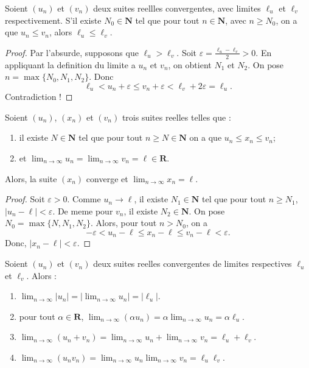 \begin{proposition}
Soient $(u_{n})$ et $(v_{n})$ deux suites reellles convergentes, avec limites $\ell _{u}$ et $\ell _{v}$ respectivement. S'il existe $N_{0}\in \mathbf{N}$ tel que pour tout $n\in \mathbf{N}$, avec $n\ge N_{0}$, on a que $u_{n}\le v_{n}$, alors $\ell _{u}\le \ell _{v}$.
\end{proposition}
\begin{proof}
	Par l'absurde, supposons que $\ell _{u} >\ell _{v}$. Soit $\varepsilon=\frac{\ell _{u}-\ell _{v} }{2}>0$. En appliquant la definition du limite a $u_{n}$ et $v_{n}$, on obtient $N_{1}$ et $N_{2}$. On pose $n=\max\{ N_{0},N_{1},N_{2} \}$. Donc 
	$$
\ell _{u}<u_{n}+\varepsilon\le v_{n}+\varepsilon<\ell _{v}+2\varepsilon=\ell _{u}.
$$
Contradiction !
\end{proof}
\begin{theorem}
Soient $(u_{n})$, $(x_{n})$ et $(v_{n})$ trois suites reelles telles que :
\begin{enumerate}
\item il existe $N\in \mathbf{N}$ tel que pour tout $n\ge N\in \mathbf{N}$ on a que $u_{n}\le x_{n}\le v_n$;
\item et $\lim_{ n \to \infty }u_{n}=\lim_{ n \to \infty }v_{n}=\ell \in \mathbf{R}$.
\end{enumerate}
Alors, la suite $(x_{n})$ converge et $\lim_{ n \to \infty }x_{n}=\ell$.
\end{theorem}
\begin{proof}
Soit $\varepsilon>0$. Comme $u_{n}\to \ell$, il existe $N_{1}\in \mathbf{N}$ tel que pour tout $n\ge N_{1}$, $|u_{n}-\ell|<\varepsilon$. De meme pour $v_{n}$, il existe $N_{2}\in \mathbf{N}$. On pose $N_{0}=\max\{N,N_{1},N_{2}\}$. Alors, pour tout $n>N_{0}$, on a 
$$
-\varepsilon<u_{n}-\ell\le x_{n}-\ell\le v_{n}-\ell<\varepsilon.
$$
Donc, $|x_{n}-\ell|<\varepsilon$.
\end{proof}
\begin{proposition}
Soient $(u_{n})$ et $(v_{n})$ deux suites reelles convergentes de limites respectives $\ell _{u}$ et $\ell _{v}$. Alors :
\begin{enumerate}
\item $\lim_{ n \to \infty }|u_{n}|=|\lim_{ n \to \infty }u_{n}|=|\ell _{u}|$.
	\item pour tout $\alpha \in \mathbf{R}$, $\lim_{ n \to \infty }(\alpha u_{n})=\alpha \lim_{ n \to \infty }u_{n}=\alpha \ell _{u}$.
\item $\lim_{ n \to \infty }(u_{n}+v_{n})=\lim_{ n \to \infty }u_{n}+\lim_{ n \to \infty }v_{n}=\ell _{u}+\ell _{v}$.
\item $\lim_{ n \to \infty }(u_{n}v_{n})=\lim_{ n \to \infty }u_{n}\lim_{ n \to \infty }v_{n}=\ell _{u}\ell _{v}$.
\end{enumerate}
\end{proposition}

